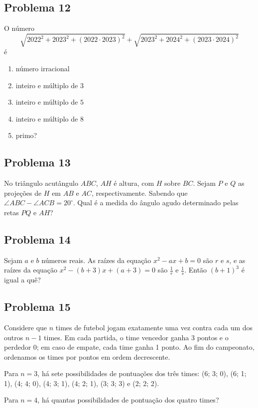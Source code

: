 \documentclass[12pt]{article}
\begin{document}
\clearpage

\subsection{Problema 12}
\begin{tcolorbox}[statementbox]
O número
\[
  \sqrt{2022^2 + 2023^2 + (2022\cdot2023)^2} + \sqrt{2023^2 + 2024^2 + (2023\cdot2024)^2}
\]
é
\begin{enumerate}[label=({\Alph*})]
  \item número irracional 
  \item inteiro e múltiplo de $3$ 
  \item inteiro e múltiplo de $5$ 
  \item inteiro e múltiplo de $8$ 
  \item primo?
\end{enumerate}
\end{tcolorbox}

\clearpage

\subsection{Problema 13}
\begin{tcolorbox}[statementbox]
No triângulo acutângulo \(ABC\), \(AH\) é altura, com \(H\) sobre \(BC\). Sejam \(P\) e \(Q\) as projeções de \(H\) em \(AB\)
e \(AC\), respectivamente. Sabendo que \(\angle ABC - \angle ACB = 20^\circ\). Qual é a medida do ângulo agudo determinado pelas retas \(PQ\)
e \(AH\)?
\end{tcolorbox}

\clearpage

\subsection{Problema 14}
\begin{tcolorbox}[statementbox]
Sejam \(a\) e \(b\) números reais. As raízes da equação \(x^2 - a x + b = 0\) são \(r\) e \(s\), e as raízes da equação
\(x^2 - (b+3)x + (a+3) = 0\) são \(\frac{1}{r}\) e \(\frac{1}{s}\). Então \((b+1)^3\) é igual a quê?
\end{tcolorbox}

\clearpage

\subsection{Problema 15}
\begin{tcolorbox}[statementbox]
Considere que \(n\) times de futebol jogam exatamente uma vez contra cada um dos outros \(n-1\) times. Em cada partida, o time 
vencedor ganha 3 pontos e o perdedor 0; em caso de empate, cada time ganha 1 ponto. Ao fim do campeonato, ordenamos os times por 
pontos em ordem decrescente.

Para \(n=3\), há sete possibilidades de pontuações dos três times: (6; 3; 0), (6; 1; 1), (4; 4; 0), (4; 3; 1), (4; 2; 1),
(3; 3; 3) e (2; 2; 2).

Para \(n=4\), há quantas possibilidades de pontuação dos quatro times?

\end{tcolorbox}
\end{document}
